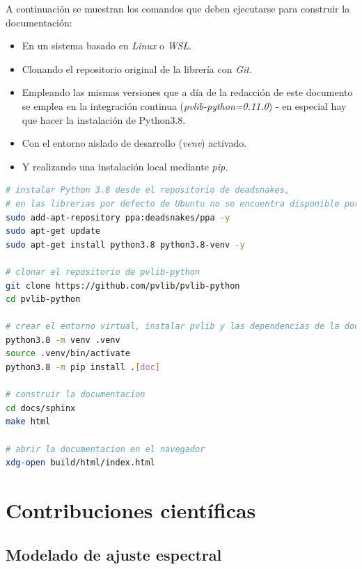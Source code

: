 A continuación se muestran los comandos que deben ejecutarse para construir la documentación:

\begin{itemize}
    \item En un sistema basado en \textit{Linux} o \textit{WSL}.
    \item Clonando el repositorio original de la librería con \textit{Git}.
    \item Empleando las mismas versiones que a día de la redacción de este documento se emplea en la integración continua (\textit{pvlib-python=0.11.0}) - en especial hay que hacer la instalación de Python3.8.
    \item Con el entorno aislado de desarrollo (\textit{venv}) activado.
    \item Y realizando una instalación local mediante \textit{pip}.
\end{itemize}

\begin{lstlisting}[language=bash, caption={Comandos para construir la documentación de \textit{pvlib-python}.}, label={lst:doc_build}]
# instalar Python 3.8 desde el repositorio de deadsnakes,
# en las librerias por defecto de Ubuntu no se encuentra disponible por antiguedad
sudo add-apt-repository ppa:deadsnakes/ppa -y
sudo apt-get update
sudo apt-get install python3.8 python3.8-venv -y

# clonar el repositorio de pvlib-python
git clone https://github.com/pvlib/pvlib-python
cd pvlib-python

# crear el entorno virtual, instalar pvlib y las dependencias de la documentacion
python3.8 -m venv .venv
source .venv/bin/activate
python3.8 -m pip install .[doc]

# construir la documentacion
cd docs/sphinx
make html

# abrir la documentacion en el navegador
xdg-open build/html/index.html
\end{lstlisting}

\section{Contribuciones científicas} \label{sct:desarrollo:contribuciones_cientificas}

\subsection{Modelado de ajuste espectral}

